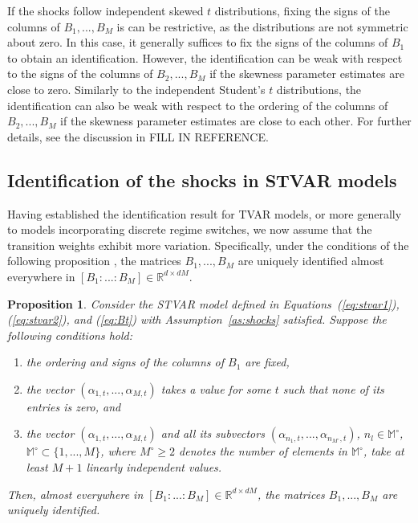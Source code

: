 \documentclass[nojss]{jss}
\newtheorem{proposition}{Proposition}
\begin{document}
If the shocks follow independent skewed $t$ distributions, fixing the signs of the columns of $B_1,...,B_M$ is can be restrictive, as the distributions are not symmetric about zero. In this case, it generally suffices to fix the signs of the columns of $B_1$ to obtain an identification. However, the identification can be weak with respect to the signs of the columns of $B_2,...,B_M$ if the skewness parameter estimates are close to zero. Similarly to the independent Student's $t$ distributions, the identification can also be weak with respect to the ordering of the columns of $B_2,...,B_M$ if the skewness parameter estimates are close to each other. For further details, see the discussion in FILL IN REFERENCE.

\subsection{Identification of the shocks in STVAR models}\label{sec:identstvar}

Having established the identification result for TVAR models, or more generally to models incorporating discrete regime switches, we now assume that the transition weights exhibit more variation. Specifically, under the conditions of the following proposition \citep[][Proposition~2]{Virolainen2:2024}, the matrices $B_1,...,B_M$ are uniquely identified almost everywhere in $[B_1:...:B_M] \in\mathbb{R}^{d\times dM}$.

\begin{proposition}\label{prop:stvar_ident}
Consider the STVAR model defined in Equations~(\ref{eq:stvar1}), (\ref{eq:stvar2}), and (\ref{eq:Bt}) with Assumption~\ref{as:shocks} satisfied. Suppose the following conditions hold:
\begin{enumerate}%
\item the ordering and signs of the columns of $B_1$ are fixed,\label{cond:stvar_B_1}
\item the vector $(\alpha_{1,t},...,\alpha_{M,t})$ takes a value for some $t$ such that none of its entries is zero, and\label{cond:stvar_alpha}
\item the vector $(\alpha_{1,t},...,\alpha_{M,t})$ and all its subvectors $(\alpha_{n_1,t},...,\alpha_{n_{M^\circ},t})$, $n_l\in\mathbb{M^\circ}$, $\mathbb{M^\circ}\subset \lbrace 1,...,M \rbrace$, where $M^{\circ}\geq 2$ denotes the number of elements in $\mathbb{M^\circ}$, take at least $M+1$ linearly independent values.\label{cond:stvar_variability}
\end{enumerate}
Then, almost everywhere in $[B_1:...:B_M] \in\mathbb{R}^{d\times dM}$, the matrices $B_1,...,B_M$ are uniquely identified.
\end{proposition}
\end{document}

